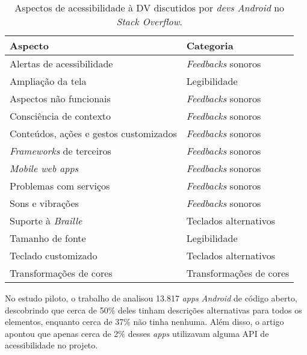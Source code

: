 \begin{table}[htb]
  \begin{center}
    \ABNTEXfontereduzida
    \caption{Aspectos de acessibilidade à DV discutidos por \emph{devs Android} no \emph{Stack Overflow}.}
    \label{tab-acc-asp-sta-flow}
    \begin{tabular}{p{7.0cm}|p{3.5cm}}
      \textbf{Aspecto}                       & \textbf{Categoria}       \\
      \hline
      Alertas de acessibilidade              & \emph{Feedbacks} sonoros \\
      \hline
      Ampliação da tela                      & Legibilidade             \\
      \hline
      Aspectos não funcionais                & \emph{Feedbacks} sonoros \\
      \hline
      Consciência de contexto                & \emph{Feedbacks} sonoros \\
      \hline
      Conteúdos, ações e gestos customizados & \emph{Feedbacks} sonoros \\
      \hline
      \emph{Frameworks} de terceiros         & \emph{Feedbacks} sonoros \\
      \hline
      \emph{Mobile web apps}                 & \emph{Feedbacks} sonoros \\
      \hline
      Problemas com serviços                 & \emph{Feedbacks} sonoros \\
      \hline
      Sons e vibrações                       & \emph{Feedbacks} sonoros \\
      \hline
      Suporte à \emph{Braille}               & Teclados alternativos    \\
      \hline
      Tamanho de fonte                       & Legibilidade             \\
      \hline
      Teclado customizado                    & Teclados alternativos    \\
      \hline
      Transformações de cores                & Transformações de cores  \\
    \end{tabular}
  \end{center}
\end{table}

No estudo piloto, o trabalho de  analisou 13.817 \emph{apps Android} de código aberto, descobrindo que cerca de 50\% deles tinham descrições alternativas para todos os elementos, enquanto cerca de 37\% não tinha nenhuma.
Além disso, o artigo apontou que apenas cerca de 2\% desses \emph{apps} utilizavam alguma API de acessibilidade no projeto.

